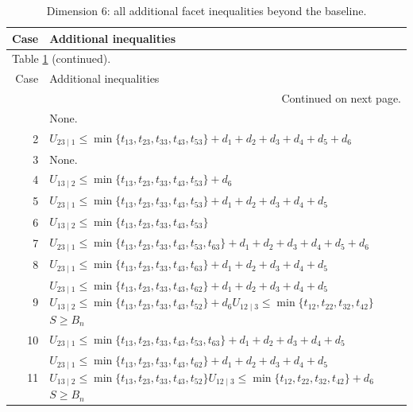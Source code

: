 \documentclass[a4paper,11pt]{amsart}
\numberwithin{equation}{section}
\theoremstyle{definition}
\theoremstyle{remark}
\begin{document}
\clearpage
{\small\setlength{\tabcolsep}{4.5pt}
\begin{longtable}{@{}r>{\raggedright\arraybackslash}p{12.9cm}@{}}
\caption{Dimension $ 6$: all additional facet inequalities beyond the baseline.}\label{tab:extras-n6}\\
\toprule
Case & Additional inequalities\\
\midrule\endfirsthead
\multicolumn{2}{l}{\small Table \ref{tab:extras-n6} (continued).}\\
\toprule
Case & Additional inequalities\\
\midrule\endhead
\midrule
\multicolumn{2}{r}{\small Continued on next page.}\\
\endfoot\bottomrule\endlastfoot
1 & None.\\[3pt]
2 & \(U_{23\mid 1}\leq \min\{t_{13},t_{23},t_{33},t_{43},t_{53}\}+d_{1}+d_{2}+d_{3}+d_{4}+d_{5}+d_{6}\)\\[3pt]
3 & None.\\[3pt]
4 & \(U_{13\mid 2}\leq \min\{t_{13},t_{23},t_{33},t_{43},t_{53}\}+d_{6}\)\\[3pt]
5 & \(U_{23\mid 1}\leq \min\{t_{13},t_{23},t_{33},t_{43},t_{53}\}+d_{1}+d_{2}+d_{3}+d_{4}+d_{5}\)\\[3pt]
6 & \(U_{13\mid 2}\leq \min\{t_{13},t_{23},t_{33},t_{43},t_{53}\}\)\\[3pt]
7 & \(U_{23\mid 1}\leq \min\{t_{13},t_{23},t_{33},t_{43},t_{53},t_{63}\}+d_{1}+d_{2}+d_{3}+d_{4}+d_{5}+d_{6}\)\\[3pt]
8 & \(U_{23\mid 1}\leq \min\{t_{13},t_{23},t_{33},t_{43},t_{63}\}+d_{1}+d_{2}+d_{3}+d_{4}+d_{5}\)\\[3pt]
9 & \(U_{23\mid 1}\leq \min\{t_{13},t_{23},t_{33},t_{43},t_{62}\}+d_{1}+d_{2}+d_{3}+d_{4}+d_{5}\)\newline \(U_{13\mid 2}\leq \min\{t_{13},t_{23},t_{33},t_{43},t_{52}\}+d_{6}\)\newline \(U_{12\mid 3}\leq \min\{t_{12},t_{22},t_{32},t_{42}\}\)\newline \(S\geq B_n\)\\[3pt]
10 & \(U_{23\mid 1}\leq \min\{t_{13},t_{23},t_{33},t_{43},t_{53},t_{63}\}+d_{1}+d_{2}+d_{3}+d_{4}+d_{5}\)\\[3pt]
11 & \(U_{23\mid 1}\leq \min\{t_{13},t_{23},t_{33},t_{43},t_{62}\}+d_{1}+d_{2}+d_{3}+d_{4}+d_{5}\)\newline \(U_{13\mid 2}\leq \min\{t_{13},t_{23},t_{33},t_{43},t_{52}\}\)\newline \(U_{12\mid 3}\leq \min\{t_{12},t_{22},t_{32},t_{42}\}+d_{6}\)\newline \(S\geq B_n\)\\[3pt]

\end{longtable}}
\end{document}
